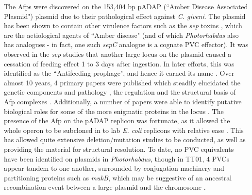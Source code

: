 The Afps were discovered on the 153,404 bp pADAP (``Amber Disease Associated Plasmid") plasmid \citep{Hurst2011a} due to their pathological effect against \emph{C. giveni}. The plasmid has been shown to contain other virulence factors such as the \emph{sep} toxins \citep{Hurst2000}, which are the aetiological agents of ``Amber disease" (and of which \emph{Photorhabdus} also has analogues - in fact, one such \emph{sepC} analogue is a cognate PVC effector). It was observed in the \emph{sep} studies that another large locus on the plasmid caused a cessation of feeding effect 1 to 3 days after ingestion. In later efforts, this was identified as the ``Antifeeding prophage", and hence it earned its name \citep{Hurst2004}. Over almost 10 years, 4 primary papers were published which steadily elucidated the genetic components and pathology \citep{Hurst2004}, the regulation \citep{Hurst2007a} and the structural basis of Afp complexes \citep{Sen2010, Heymann2013}. Additionally, a number of papers were able to identify putative biological roles for some of the more enigmatic proteins in the locus \cite{Rybakova2013, Rybakova2015}. The presence of the Afp on the pADAP replicon was fortunate, as it allowed the whole operon to be subcloned in to lab \emph{E. coli} replicons with relative ease \citep{Hurst2004}. This has allowed quite extensive deletion/mutation studies to be conducted, as well as providing the material for structural resolution. To date, no PVC equivalents have been identified on plasmids in \emph{Photorhabdus}, though in \Plum{} TT01, 4 PVCs appear tandem to one another, surrounded by conjugation machinery and partitioning proteins such as \emph{mukB}, which may be suggestive of an ancestral recombination event between a large plasmid and the chromosome \citep{Yang2006}.

